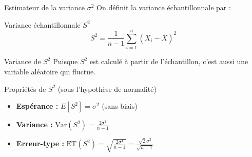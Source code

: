 \documentclass{BeamerTemplate}
\begin{document}
\begin{frame}[t]{Estimateur de la variance $\sigma^2$}
  On définit la variance échantillonnale par :
  \begin{Boite}{Variance échantillonnale $S^2$}
    $$S^2 = \frac{1}{n-1}\sum_{i=1}^n (X_i - \overline{X})^2$$
  \end{Boite}

  \medskip
\end{frame}

\begin{frame}[t]{Variance de $S^2$}
  Puisque $S^2$ est calculé à partir de l'échantillon, c'est aussi une variable aléatoire qui fluctue.

  \bigskip
  \begin{Boite}{Propriétés de $S^2$ (sous l'hypothèse de normalité)}
    \begin{itemize}\itemsep 3mm
      \item \textbf{Espérance :} $E[S^2] = \sigma^2$ (sans biais)
      \item \textbf{Variance :} $\text{Var}(S^2) = \frac{2\sigma^4}{n-1}$
      \item \textbf{Erreur-type :} $\text{ET}(S^2) = \sqrt{\frac{2\sigma^4}{n-1}} = \frac{\sqrt{2}\sigma^2}{\sqrt{n-1}}$
    \end{itemize}
  \end{Boite}

  \bigskip
\end{frame}
\end{document}
